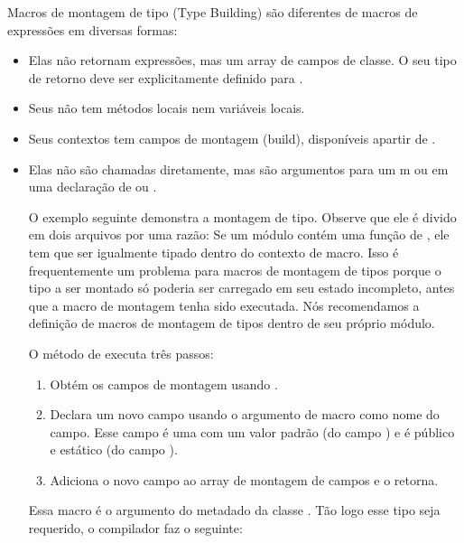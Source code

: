 Macros de montagem de tipo (Type Building) são diferentes de macros de expressões em diversas formas:
\begin{itemize}
    \item Elas não retornam expressões, mas um array de campos de classe. O seu tipo de retorno deve ser explicitamente definido para .
    \item Seus  não tem métodos locais nem variáveis locais.
    \item Seus contextos tem campos de montagem (build), disponíveis apartir de .
    \item Elas não são chamadas diretamente, mas são argumentos para um m  ou  em uma declaração de  ou .

        O exemplo seguinte demonstra a montagem de tipo. Observe que ele é divido em dois arquivos por uma razão: Se um módulo contém uma função de , ele tem que ser igualmente tipado dentro do contexto de macro. Isso  é frequentemente um problema para macros de montagem de tipos porque o tipo a ser montado só poderia ser carregado em seu estado incompleto, antes que a macro de montagem tenha sido executada. Nós recomendamos a definição de macros de montagem de tipos dentro de seu próprio módulo.


O método  de  executa três passos:

\begin{enumerate}
    \item Obtém os campos de montagem usando .
    \item Declara um novo campo  usando o argumento de macro  como nome do campo. Esse campo é uma   com um valor padrão  (do campo ) e é público e estático (do campo ).
    \item Adiciona o novo campo ao array de montagem de campos e o retorna.
\end{enumerate}

Essa macro é o argumento do metadado  da classe . Tão logo esse tipo seja requerido, o compilador faz o seguinte:


\end{itemize}
